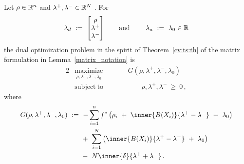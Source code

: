 \begin{lemma}
  \label{lemma_dual_app}
  Let 
  $
    \rho\in\mathbb{R}^n
  $
  and
  $
    \lambda^+,\lambda^-\in\mathbb{R}^N
  $
  . For 
  \begin{gather}
    \lambda_d
    \ 
    :=
    \ 
    \begin{bmatrix}
      \rho\\
      \lambda^+\\
      \lambda^-
    \end{bmatrix}
    \qquad
    \text{and}\ 
    \qquad
    \lambda_a\ :=\ \lambda_0\in\R
  \end{gather}
  the dual optimization problem in the spirit of Theorem~\ref{cv:ts:th} of the matrix formulation in 
  Lemma~\ref{matrix_notation}
  is
  \begin{alignat*}{2}
    \label{cv:ts:dual}
    &\underset{
    \rho,\lambda^+,\lambda^-,\lambda_0
  }
    {\mathrm{maximize}}
    &&\qquad
  G(\rho,\lambda^+,\lambda^-,\lambda_0)
    \quad
    \\
    \nonumber
    &\mathrm{subject}\ \mathrm{to} 
    &&\qquad\qquad
    \rho,\lambda^+,\lambda^-
    \ 
    \ge
    \ 
    0
    \,,
\end{alignat*}
where
\begin{align*}
  G(\rho,\lambda^+,\lambda^-,\lambda_0)
  &
  \ 
  :=
  \ 
    -
    \sum_{i=1}^{n} 
    f^*
    \left( 
      \rho_i
      \ 
      +
      \ 
      \inner{B(X_i)}{\lambda^+-\lambda^-}
      \ 
      +
      \ 
      \lambda_0
    \right)
    \\
    &
    \qquad 
    +
    \ 
    \sum_{i=1}^{N} 
    \left( 
      \inner{B(X_i)}{\lambda^+-\lambda^-}
      \ 
      +
      \ 
      \lambda_0
    \right)
    \\
    &
    \qquad 
    -
    \ 
    N
    \inner{\delta}{\lambda^++\lambda^-}
    \,.
\end{align*}
\end{lemma}

